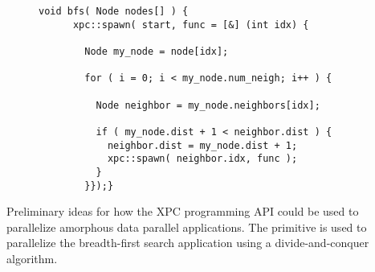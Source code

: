

  \cbxsetfontsize{8pt}
  \begin{subfigure}{\tw}
  \begin{Verbatim}[gobble=6]
    void bfs( Node nodes[] ) {
      xpc::spawn( start, func = [&] (int idx) {

        Node my_node = node[idx];

        for ( i = 0; i < my_node.num_neigh; i++ ) {

          Node neighbor = my_node.neighbors[idx];

          if ( my_node.dist + 1 < neighbor.dist ) {
            neighbor.dist = my_node.dist + 1;
            xpc::spawn( neighbor.idx, func );
          }
        }});}
  \end{Verbatim}
  \end{subfigure}

  \caption{ Preliminary
    ideas for how the XPC programming API could be used to parallelize
    amorphous data parallel applications. The  primitive is
    used to parallelize the breadth-first search application using a
    divide-and-conquer algorithm.}
  \label{fig-xpc-api}

